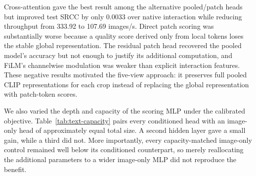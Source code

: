\documentclass{article}
\begin{document}
\begin{table}[htbp]
\centering
\small
\setlength{\tabcolsep}{5pt}
\caption{Text-fusion architecture ablation on the three-dataset mixture.}
\label{tab:text-head-ablation}
\end{table}

Cross-attention gave the best result among the alternative pooled/patch heads but improved test SRCC by only 0.0033 over native interaction while reducing throughput from 333.92 to 107.69 images/s. Direct patch scoring was substantially worse because a quality score derived only from local tokens loses the stable global representation. The residual patch head recovered the pooled model's accuracy but not enough to justify its additional computation, and FiLM's channelwise modulation was weaker than explicit interaction features. These negative results motivated the five-view approach: it preserves full pooled CLIP representations for each crop instead of replacing the global representation with patch-token scores.

We also varied the depth and capacity of the scoring MLP under the calibrated objective. Table~\ref{tab:text-capacity} pairs every conditioned head with an image-only head of approximately equal total size. A second hidden layer gave a small gain, while a third did not. More importantly, every capacity-matched image-only control remained well below its conditioned counterpart, so merely reallocating the additional parameters to a wider image-only MLP did not reproduce the benefit.
\end{document}

